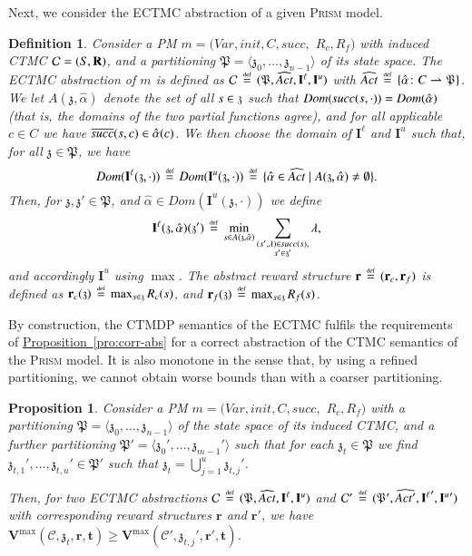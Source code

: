 \documentclass[10pt,twocolumn]{article}
\newtheorem{definition}{Definition}
\newcommand{\PRISM}{\textsc{Prism}\xspace}
\newcommand{\states} {{\ensuremath S}}
\newcommand{\state}  {{\ensuremath s}}
\newcommand{\acts}{\mathit{Act}}
\newcommand{\rmat}{\mathbf{R}}
\newcommand{\cmodel}{\mathcal{C}}
\newcommand{\act}{\alpha}
\newtheorem{proposition}{Proposition}
\newcommand{\rew}{\mathbf{r}}
\newcommand{\frew}{\mathbf{r}_f}
\newcommand{\crew}{\mathbf{r}_c}
\newcommand{\timeb}{\mathbf{t}}
\newcommand{\mvalue}{\mathbf{V}}
\newcommand{\ivall}{{\mathbf{I}^{\ell}}}
\newcommand{\ivalu}{{\mathbf{I}^u}}
\newcommand{\apart}{\mathfrak{P}}
\newcommand{\astate}{\mathfrak{z}}
\newcommand{\prismModel}{m}
\newcommand{\prismVars}{\mathit{Var}}
\newcommand{\prismInit}{\mathit{init}}
\newcommand{\prismSucc}{\mathit{succ}}
\newcommand{\prismNSucc}{\overline{\prismSucc}}
\newcommand{\prismCmds}{C}
\newcommand{\prismCmd}{c}
\newcommand{\prismCRew}{R_c}
\newcommand{\prismFRew}{R_f}
\newcommand{\refpro}[1]{\texorpdfstring{\hyperref[pro:#1]{Proposition~\ref*{pro:#1}}}{Proposition~\ref*{pro:#1}}}
\newcommand{\defeq}{\,\stackrel{\mbox{\rm {\tiny def}}}{=}\,}
\newcommand{\partialto}{\rightharpoonup}
\newcommand{\dom}{\mathit{Dom}}
\begin{document}
Next, we consider the ECTMC abstraction of a given \PRISM model.
\begin{definition}
  \label{def:cmc-abs}
Consider a PM $\prismModel = (\prismVars, \prismInit, \prismCmds, \prismSucc,$ $\prismCRew, \prismFRew)$ 
  with induced CTMC $\cmodel = (\states, \rmat)$, and a partitioning 
  $\apart = \langle \astate_0, \ldots, \astate_{n-1}\rangle$ of its state space.
  The \emph{ECTMC abstraction} of $\prismModel$ is defined as
  $\cmodel \defeq (\apart, \widehat{\acts}, \ivall, \ivalu)$
  with $\widehat{\acts} \defeq \{ \hat{\act}\colon \prismCmds \partialto \apart \}$.
  We let $A(\astate, \hat{\act})$ denote the set of all $\state \in \astate$ such that 
  $\dom(\prismSucc(\state, \cdot)) = \dom(\hat{\act})$ (that is, the domains of 
  the two partial functions agree), and for all applicable $\prismCmd \in \prismCmds$ 
  we have $\prismNSucc(\state, \prismCmd) \in \hat{\act}(\prismCmd)$.
  We then choose the domain of $\ivall$ and $\ivalu$ such that, for all $\astate \in \apart$, we have
\[
  \dom(\ivall(\astate, \cdot))
  \defeq \dom(\ivalu(\astate, \cdot))
  \defeq \{ \hat{\act} \in \widehat{\acts} \mid A(\astate, \hat{\act}) \neq \emptyset \} .
  \]
Then, for $\astate,\astate' \in \apart$, and $\hat{\act} \in \dom(\ivalu(\astate, \cdot))$ we define
\[
  \ivall(\astate, \hat{\act})(\astate') \defeq \min_{\state \in A(\astate, \hat{\act})} \sum_{\substack{(\state', \lambda) \in \prismSucc(\state), \\ \state' \in \astate'}} \lambda,
  \]
and accordingly $\ivalu$ using $\max$.
  The abstract reward structure $\rew \defeq (\crew, \frew)$ is defined as $\crew(\astate) \defeq \max_{\state \in \astate} \prismCRew(\state)$,
  and $\frew(\astate) \defeq \max_{\state \in \astate} \prismFRew(\state)$.
\end{definition}
By construction, the CTMDP semantics of the ECTMC fulfils the
requirements of \refpro{corr-abs} for a correct abstraction of the
CTMC semantics of the \PRISM model. It is also monotone in the sense
that, by using a refined partitioning, we cannot obtain worse bounds
than with a coarser partitioning.
\begin{proposition}
  \label{pro:monotone}
Consider a PM $\prismModel = (\prismVars, \prismInit, \prismCmds, \prismSucc,$ $\prismCRew, \prismFRew)$ 
  with a partitioning $\apart = \langle\astate_0, \ldots, \astate_{n-1}\rangle$ 
  of the state space of its induced CTMC, and a further partitioning 
  $\apart' = \langle \astate_0', \ldots, \astate_{m-1}'\rangle$ such that for each 
  $\astate_t \in \apart$ we find $\astate_{t,1}', \ldots, \astate_{t,u}' \in \apart'$ 
  such that $\astate_t = \bigcup_{j=1}^u \astate_{t,j}'$.

  Then, for two ECTMC abstractions 
  $\cmodel \defeq (\apart, \widehat{\acts}, \ivall, \ivalu)$ and 
  $\cmodel' \defeq (\apart', \widehat{\acts'}, \ivall', \ivalu')$ 
  with corresponding reward structures $\rew$ and $\rew'$,
  we have $\mvalue^{\max}(\cmodel, \astate_t, \rew, \timeb) \geq \mvalue^{\max}(\cmodel', \astate_{t,j}', \rew', \timeb)$.
\end{proposition}
\end{document}
